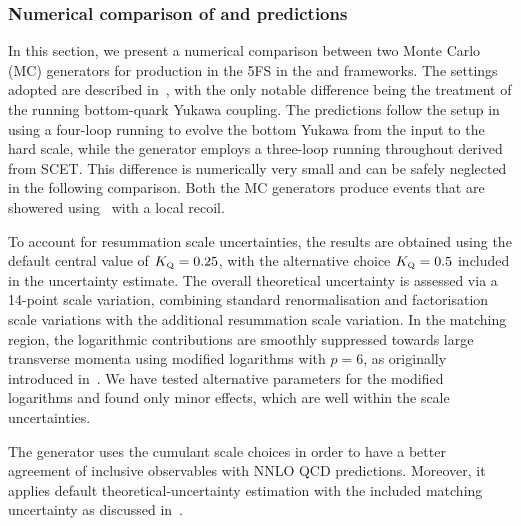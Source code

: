\documentclass[11pt,a4paper]{article}
\begin{document}
\subsubsection{Numerical comparison of \minnlo{} and \GENEVA{} predictions}
In this section, we present a numerical comparison between two Monte Carlo (MC) generators for \bbtoH{} production in the 5FS in the \minnlo{} and \GENEVA{} frameworks. The settings adopted are described in~, with the only notable difference being the treatment of the running bottom-quark Yukawa coupling. 
The \minnlo{} predictions follow the setup in  using a four-loop running 
\cite{harlander:2002wh,baikov_2014} to evolve the bottom Yukawa from 
the input to the hard scale, while the \GENEVA{} generator employs a three-loop running throughout derived from SCET. This difference is numerically very small and can be safely neglected in the following comparison. Both the MC generators produce events that are showered using~ with a local recoil.

To account for resummation scale uncertainties, the \minnlo{} results are obtained using the default central value of $\KQ = 0.25$, with the alternative choice $\KQ = 0.5$ included in the uncertainty estimate. The overall theoretical uncertainty is assessed via a 14-point scale variation, combining standard renormalisation and factorisation scale variations with the additional resummation scale variation. In the matching region, the logarithmic contributions are smoothly suppressed towards large transverse momenta using modified logarithms with $p=6$, as originally introduced in~. We have tested alternative parameters for the modified logarithms and found only minor effects, which are well within the \minnlo{} scale uncertainties.

The \GENEVA{} generator uses the cumulant scale choices in order to have a better agreement of inclusive observables with NNLO QCD predictions. Moreover, it applies default theoretical-uncertainty estimation with the included matching uncertainty as discussed in~.
\end{document}
